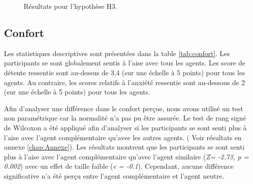 	\begin{figure}[!tbh]
		
		
		
		\caption{Résultats pour l'hypothèse H3.}
		\label{fig:tour}
	\end{figure}
	
	
	\subsection{Confort}
	
	Les statistiques descriptives sont présentées dans la table \ref{tab:confort}. Les participants se sont globalement sentis à l'aise avec tous les agents.
	Les score de détente ressentie sont au-dessus de 3,4 (sur une échelle à 5 points) pour tous les agents. Au contraire, les scores relatifs à l'anxiété  ressentie sont au-dessous de 2 (sur une échelle à 5 points) pour tous les agents. 
	
	Afin d'analyser une différence dans le confort perçue, nous avons utilisé un test non paramétrique car la normalité n'a pas pu être assurée. Le test de rang signé de Wilcoxon a été appliqué afin d'analyser si les participants se sont senti plus à l'aise avec l'agent complémentaire qu'avec les autres agents. ( Voir résultats en annexe \ref{chap:Annexe}). 
	Les résultats montrent que les participants se sont senti plus à l'aise avec l'agent complémentaire qu'avec l'agent similaire (\emph{Z= -2.73, p = 0.002})
	avec un effet de taille faible (\emph{e = -0.1}). Cependant, aucune différence significative n'a été perçu entre l'agent complémentaire et l'agent neutre. 
	
